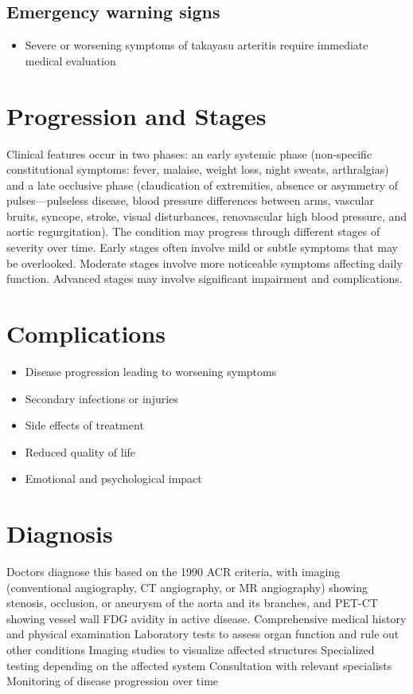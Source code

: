 \subsection{Emergency warning signs}
\begin{itemize}[noitemsep]
  \item Severe or worsening symptoms of takayasu arteritis require immediate medical evaluation
\end{itemize}
\section{Progression and Stages}
Clinical features occur in two phases: an early systemic phase (non-specific constitutional symptoms: fever, malaise, weight loss, night sweats, arthralgias) and a late occlusive phase (claudication of extremities, absence or asymmetry of pulses---pulseless disease, blood pressure differences between arms, vascular bruits, syncope, stroke, visual disturbances, renovascular high blood pressure, and aortic regurgitation). The condition may progress through different stages of severity over time. Early stages often involve mild or subtle symptoms that may be overlooked. Moderate stages involve more noticeable symptoms affecting daily function. Advanced stages may involve significant impairment and complications.
\section{Complications}
\begin{itemize}[noitemsep]
  \item Disease progression leading to worsening symptoms
  \item Secondary infections or injuries
  \item Side effects of treatment
  \item Reduced quality of life
  \item Emotional and psychological impact
\end{itemize}
\section{Diagnosis}
Doctors diagnose this based on the 1990 ACR criteria, with imaging (conventional angiography, CT angiography, or MR angiography) showing stenosis, occlusion, or aneurysm of the aorta and its branches, and PET-CT showing vessel wall FDG avidity in active disease. Comprehensive medical history and physical examination Laboratory tests to assess organ function and rule out other conditions Imaging studies to visualize affected structures Specialized testing depending on the affected system Consultation with relevant specialists Monitoring of disease progression over time

